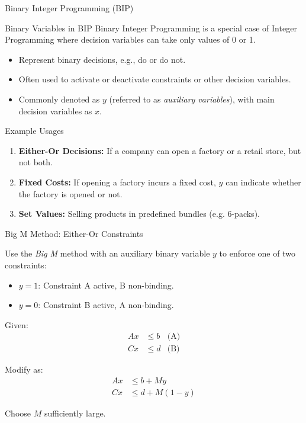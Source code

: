 \documentclass[
    NAME={Dr. Helga Ingimundardóttir},
    EMAIL={helgaingim@hi.is},
    FACULTY={Industrial Engineering},
    TITLE={Mixed Integer Programming},
    SUBTITLE={Techniques and Applications},
    SEMINAR={VÉL113F},
    DATE={Design and Optimization},
    WIDE=true
]{../HI-latex/hi-beamer}
\begin{document}
    \begin{frame}{Binary Integer Programming (BIP)}
        \begin{block}{Binary Variables in BIP}
            Binary Integer Programming is a special case of Integer Programming where decision variables can take
            only values of 0 or 1.
            \begin{itemize}
                \item Represent binary decisions, e.g., do or do not.
                \item Often used to activate or deactivate constraints or other decision variables.
                \item Commonly denoted as \( y \) (referred to as \emph{auxiliary variables}), with main decision
                variables as \( x \).
            \end{itemize}
        \end{block}
        \framebreak
        \begin{block}{Example Usages}
            \begin{enumerate}
                \item \textbf{Either-Or Decisions:} If a company can open a factory or a retail store, but not both.
                \item \textbf{Fixed Costs:} If opening a factory incurs a fixed cost, \( y \) can indicate whether
                the factory is opened or not.
                \item \textbf{Set Values:} Selling products in predefined bundles (e.g. 6-packs).
            \end{enumerate}
        \end{block}
    \end{frame}
    \begin{frame}{Big M Method: Either-Or Constraints}
        \small

        Use the \emph{Big M} method with an auxiliary binary variable \( y \) to enforce one of two constraints:
        \begin{itemize}
            \item \( y = 1 \): Constraint A active, B non-binding.
            \item \( y = 0 \): Constraint B active, A non-binding.
        \end{itemize}

        Given:
        \begin{align*}
            Ax &\leq b & \text{(A)} \\
            Cx &\leq d & \text{(B)}
        \end{align*}

        Modify as:
        \begin{align*}
            Ax &\leq b + My \\
            Cx &\leq d + M(1-y)
        \end{align*}

        Choose \( M \) sufficiently large.


    \end{frame}
\end{document}
